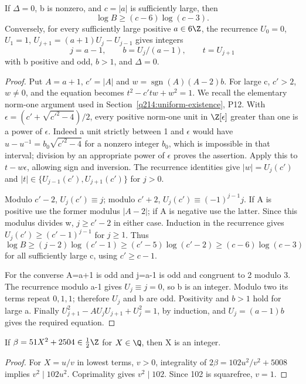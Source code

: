 \begin{lemma}\label{q198:affine-lucas}
If $\Delta=0$, b is nonzero, and $c=|a|$ is sufficiently large,
then
\[
                         \log B\ge(c-6)\log(c-3).
\]
Conversely, for every sufficiently large positive $a\in6\Z$, the
recurrence $U_0=0$, $U_1=1$, $U_{j+1}=(a+1)U_j-U_{j-1}$ gives
integers
\[
 j=a-1,\qquad b=U_j/(a-1),\qquad t=U_{j+1}
\]
with b positive and odd, $b>1$, and $\Delta=0$.
\end{lemma}
\begin{proof}
Put $A=a+1$, $c'=|A|$ and $w=\operatorname{sgn}(A)(A-2)b$.
For large c, $c'>2$, $w\ne0$, and the equation becomes
$t^2-c'tw+w^2=1$. We recall the elementary norm-one argument used
in Section~\ref{q214:uniform-existence}, P12. With
$\epsilon=(c'+\sqrt{c'^2-4})/2$, every positive norm-one unit in
$\Z[\epsilon]$ greater than one is a power of $\epsilon$.
Indeed a unit strictly between 1 and $\epsilon$ would have
$u-u^{-1}=b_0\sqrt{c'^2-4}$ for a nonzero integer $b_0$, which is
impossible in that interval; division by an appropriate power of
$\epsilon$ proves the assertion. Apply this to $t-w\epsilon$,
allowing sign and inversion. The recurrence identities give
$|w|=U_j(c')$ and $|t|\in\{U_{j-1}(c'),U_{j+1}(c')\}$ for $j>0$.

Modulo $c'-2$, $U_j(c')\equiv j$; modulo $c'+2$,
$U_j(c')\equiv(-1)^{j-1}j$. If A is positive use the former
modulus $|A-2|$; if A is negative use the latter. Since this
modulus divides w, $j\ge c'-2$ in either case.
Induction in the recurrence gives
$U_j(c')\ge(c'-1)^{j-1}$ for $j\ge1$.
Thus
\[
 \log B\ge(j-2)\log(c'-1)
 \ge(c'-5)\log(c'-2)\ge(c-6)\log(c-3)
\]
for all sufficiently large c, using $c'\ge c-1$.

For the converse A=a+1 is odd and j=a-1 is odd and congruent
to 2 modulo 3. The recurrence modulo a-1 gives $U_j\equiv j=0$,
so b is an integer. Modulo two its terms repeat $0,1,1$; therefore
$U_j$ and b are odd. Positivity and $b>1$ hold for large a.
Finally $U_{j+1}^2-AU_jU_{j+1}+U_j^2=1$, by induction, and
$U_j=(a-1)b$ gives the required equation.
\end{proof}

\begin{lemma}\label{q198:integer-input}
If $\beta=51X^2+2504\in\tfrac12\Z$ for $X\in\Q$, then X is an
integer.
\end{lemma}
\begin{proof}
For $X=u/v$ in lowest terms, $v>0$, integrality of
$2\beta=102u^2/v^2+5008$ implies $v^2\mid102u^2$.
Coprimality gives $v^2\mid102$. Since 102 is squarefree, $v=1$.
\end{proof}

